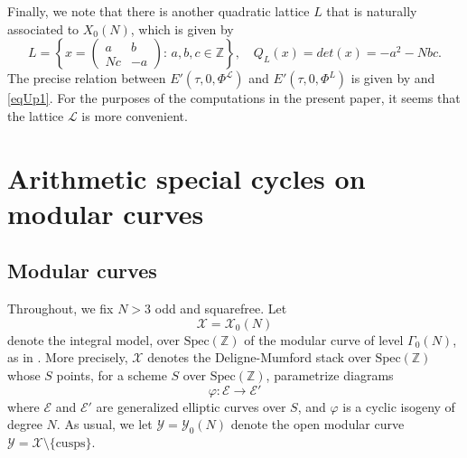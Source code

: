 \documentclass[reqno,oneside]{amsart}
\theoremstyle{plain}
\theoremstyle{remark}
\numberwithin{theorem}{section}
\newcommand{\bbZ}{\mathbb Z}
\newcommand{\calE}{\mathcal E}
\newcommand{\calL}{\mathcal L}
\newcommand{\calX}{\mathcal X}
\newcommand{\calY}{\mathcal Y}
\newcommand{\Spec}{\mathrm{Spec}}
\newcommand{\Z}{\mathbb{Z}}
\begin{document}
	Finally, we note that there is another quadratic lattice $L$ that is naturally associated to $X_0(N)$, which  is given  by
	\begin{equation}
	L=\left\{x=\begin{pmatrix} a &b \\ Nc & -a \end{pmatrix}:\,  a, b, c  \in \Z  \right\},  \quad  Q_L(x)= det(x) = -a^2 - N bc.
	\end{equation}
	The precise relation between $E'(\tau, 0, \Phi^{\calL})$ and $E'(\tau, 0, \Phi^{L})$  is given by   and \eqref{eqUp1}. For the purposes of the computations in the present paper, it seems that the lattice $\mathcal L$ is more convenient.
	

	
	\section{Arithmetic special cycles on modular curves}
	\subsection{Modular curves}
	Throughout, we fix $N>3$ odd and squarefree. Let
	\begin{equation}
	\calX = \calX_0(N)
	\end{equation}
	denote the integral model, over $\Spec(\bbZ)$ of the modular curve of level $\Gamma_0(N)$, as in \cite{KatzMazur}. More precisely, $\calX$ denotes the Deligne-Mumford stack over $\mathrm{Spec}(\bbZ)$ whose $S$ points, for a scheme $S$ over $\Spec(\bbZ)$, parametrize diagrams
	\begin{equation}
	\varphi \colon \calE \to \calE'
	\end{equation}
	where $\calE$ and $\calE'$ are generalized elliptic curves over $S$, and $\varphi$ is a cyclic isogeny of degree $N$. As usual, we let $\calY = \calY_0(N)$ denote the open modular curve $ \calY = \calX \setminus \{ \text{cusps} \}$.
	
\end{document}
